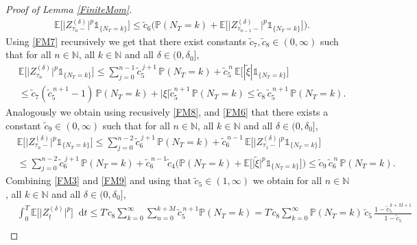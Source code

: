 \documentclass[11pt,a4paper]{article}
\numberwithin{equation}{section}
\theoremstyle{definition}
\newcommand{\E}{{\mathbb{E}}}
\newcommand{\N}{{\mathbb{N}}}
\renewcommand{\P}{{\mathbb{P}}}
\newcommand{\diff}{\mathop{}\!\mathrm{d}}
\begin{document}
\begin{proof}[Proof of Lemma \ref{FiniteMom}]
\begin{align}
    &\E\Big[\big|Z^{(\delta)}_{\tau_{n}-}\big|^p\mathds{1}_{\{N_T =k\}}\Big]
    \leq \widetilde c_6\Big( \P(N_T =k)+  \E\Big[\big|Z^{(\delta)}_{\tau_{n-1}-}\big|^p\mathds{1}_{\{N_T =k\}}\Big]\Big).\label{FM8}
\end{align}
Using \eqref{FM7} recursively we get that there exist constants $\widetilde c_7, \widetilde c_8 \in(0,\infty)$ such that for all $n\in\N$, all $k\in\N$ and all $\delta \in (0,\delta_0]$,
\begin{equation}
    \begin{aligned}\label{FM9}
    &\E\Big[\big|Z^{(\delta)}_{\tau_{n}}\big|^p\mathds{1}_{\{N_T =k\}}\Big]
    \leq \sum_{j=0}^{n-1} \widetilde c_5^{\,j+1}\, \P(N_T =k) + \widetilde c_5^{\,n}\, \E\Big[ |\widetilde \xi| \mathds{1}_{\{N_T =k\}} \Big]\\
    &\leq \widetilde c_7 (\widetilde c_5^{\,n+1}-1) \, \P(N_T =k) + |\xi| \widetilde c_5^{n+1} \, \P(N_T =k) \leq \widetilde c_8 \,\widetilde c_5^{\,n+1} \, \P(N_T =k).
    \end{aligned}
\end{equation}
Analogously we obtain using recusively \eqref{FM8}, and \eqref{FM6} that there exists a constant $\widetilde c_9\in(0,\infty)$ such that for all $n\in\N$, all $k\in\N$ and all $\delta \in (0,\delta_0]$,
\begin{equation}
    \begin{aligned}\label{FM9a}
    &\E\Big[\big|Z^{(\delta)}_{\tau_{n}-}\big|^p\mathds{1}_{\{N_T =k\}}\Big]
    \leq \sum_{j=0}^{n-2} \widetilde c_6^{\,j+1}\, \P( N_T =k) + \widetilde c_6^{\,n-1}\, \E\Big[\big|Z^{(\delta)}_{\tau_{1}-}\big|^p\mathds{1}_{\{N_T =k\}}\Big]\\
    &\leq \sum_{j=0}^{n-2} \widetilde c_6^{\,j+1}\, \P(N_T =k) + \widetilde c_6^{\,n-1} \widetilde c_4\Big(\P(N_T = k) + \E\Big[\big|\widetilde\xi \big|^p\mathds{1}_{\{N_T =k\}}\Big]\Big)
    \leq \widetilde c_9 \,\widetilde c_6^{\,n} \, \P(N_T =k).
    \end{aligned}
\end{equation}
Combining \eqref{FM3} and \eqref{FM9} and using that $\widetilde c_5 \in(1,\infty)$ we obtain for all $n\in\N$, all $k\in\N$ and all $\delta \in (0,\delta_0]$,
\begin{equation}
    \begin{aligned}\label{FM10}
    & \int_0^T \E \big[\big|Z^{(\delta)}_{\underline t}\big|^p\big] \diff t 
    \leq T \, \widetilde c_8\sum_{k=0}^{\infty} \sum_{n=0}^{k+M}  \widetilde c_5^{\,n+1} \P(N_T = k) 
    = T \, \widetilde c_8  \sum_{k=0}^{\infty} \P(N_T = k)\, \widetilde c_5 \, \frac{1- \widetilde c_5^{\,k+M+1}}{1- \widetilde c_5}\\

\end{aligned}
\end{equation}
\end{proof}
\end{document}
